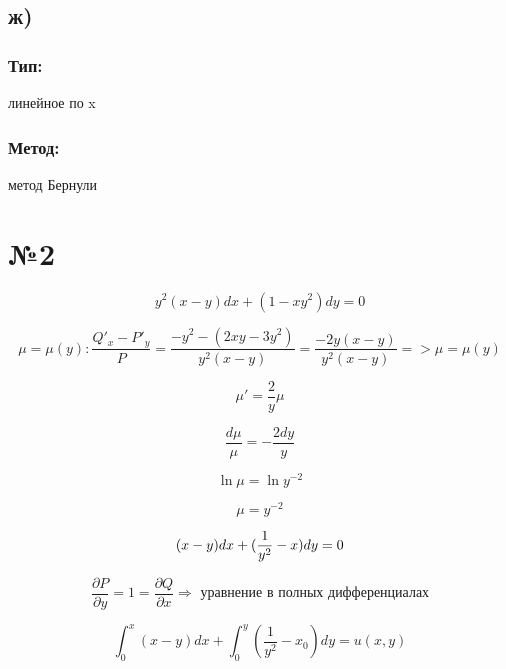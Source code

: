 \documentclass{article}
\begin{document}
\subsection*{ж)}
\subsubsection*{Тип:} 
линейное по x

\subsubsection*{Метод:}
метод Бернули 

\section*{№2}

\begin{equation*}
y^2(x - y)dx + (1 - xy^2)dy = 0
\end{equation*}

\begin{equation*}
\mu = \mu(y): \frac{Q'_x - P'_y}{P} = \frac{-y^2 - (2xy - 3y^2)}{y^2(x - y)}=\frac{-2y(x-y)}{y^{2}(x-y)} => \mu = \mu(y)
\end{equation*}


\begin{equation*}
    \mu' = \frac{2}{y}\mu
\end{equation*}

\begin{equation*}
    \frac{d\mu}{\mu} = - \frac{2dy}{y}
\end{equation*}

\begin{equation*}
    \ln{\mu} = \ln{y^{-2}}
\end{equation*}

\begin{equation*}
    \mu = y^{-2}
\end{equation*}

\begin{equation*}
    (x - y)dx + (\frac{1}{y^2}-x)dy = 0\\
\end{equation*}

\begin{equation*}
\frac{\partial P}{\partial y}=1=
\frac{\partial Q}{\partial x} \Rightarrow \text{ уравнение в полных дифференциалах}
\end{equation*}

\begin{equation*}
\int_{0}^{x}(x-y)dx+\int_{0}^{y}\left(\frac{1}{y^2}-x_0\right)dy=u(x,y)
\end{equation*}
\end{document}
